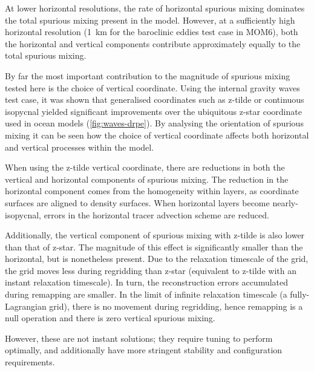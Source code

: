 At lower horizontal resolutions, the rate of horizontal spurious mixing dominates the total spurious mixing present in the model. However, at a sufficiently high horizontal resolution (\SI{1}{\kilo\metre} for the baroclinic eddies test case in MOM6), both the horizontal and vertical components contribute approximately equally to the total spurious mixing.

By far the most important contribution to the magnitude of spurious mixing tested here is the choice of vertical coordinate. Using the internal gravity waves test case, it was shown that generalised coordinates such as z-tilde or continuous isopycnal yielded significant improvements over the ubiquitous z-star coordinate used in ocean models (\cref{fig:waves-drpe}). By analysing the orientation of spurious mixing it can be seen how the choice of vertical coordinate affects both horizontal and vertical processes within the model.

When using the z-tilde vertical coordinate, there are reductions in both the vertical and horizontal components of spurious mixing. The reduction in the horizontal component comes from the homogeneity within layers, as coordinate surfaces are aligned to density surfaces. When horizontal layers become nearly-isopycnal, errors in the horizontal tracer advection scheme are reduced. %

Additionally, the vertical component of spurious mixing with z-tilde is also lower than that of z-star. The magnitude of this effect is significantly smaller than the horizontal, but is nonetheless present. Due to the relaxation timescale of the grid, the grid moves less during regridding than z-star (equivalent to z-tilde with an instant relaxation timescale). In turn, the reconstruction errors accumulated during remapping are smaller. In the limit of infinite relaxation timescale (a fully-Lagrangian grid), there is no movement during regridding, hence remapping is a null operation and there is zero vertical spurious mixing.


However, these are not instant solutions; they require tuning to perform optimally, and additionally have more stringent stability and configuration requirements.
